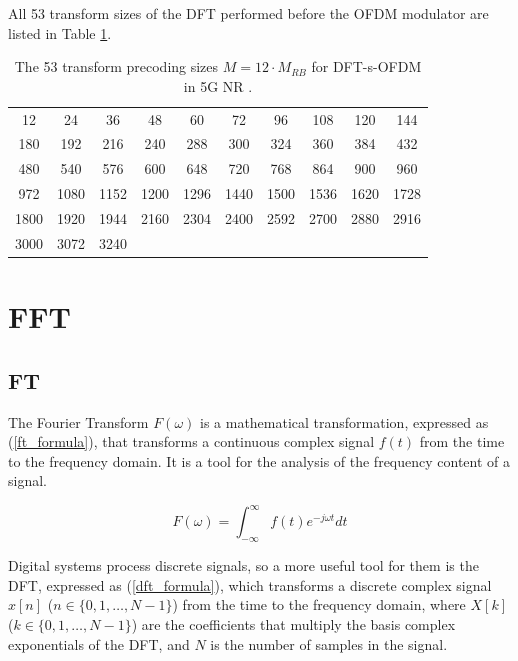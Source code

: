 \documentclass[a4paper,12pt, master]{etf}
\begin{document}
All 53 transform sizes of the DFT performed before the OFDM modulator are listed in Table \ref{tab:nr_precoding_sizes}.

\begin{table}[htb]
\centering
\caption{The 53 transform precoding sizes $M = 12 \cdot M_{RB}$ for DFT-s-OFDM in 5G NR \cite{17}.}
\medskip
\label{tab:nr_precoding_sizes}
\begin{tabular}{c c c c c c c c c c}
\hline
12 & 24 & 36 & 48 & 60 & 72 & 96 & 108 & 120 & 144\\
180 & 192 & 216 & 240 & 288 & 300 & 324 & 360 & 384 & 432\\
480 & 540 & 576 & 600 & 648 & 720 & 768 & 864 & 900 & 960\\
972 & 1080 & 1152 & 1200 & 1296 & 1440 & 1500 & 1536 & 1620 & 1728\\
1800 & 1920 & 1944 & 2160 & 2304 & 2400 & 2592 & 2700 & 2880 & 2916\\
3000 & 3072 & 3240 & & & & & & & \\
\hline
\end{tabular}
\end{table}

\section{FFT}

\subsection{FT}

The Fourier Transform $F(\omega)$ is a mathematical transformation, expressed as (\ref{ft_formula}), that transforms a continuous complex signal $f(t)$ from the time to the frequency domain. It is a tool for the analysis of the frequency content of a signal.

\begin{equation}
    F(\omega) = \int_{-\infty}^{\infty} f(t) e^{-j \omega t} dt
\label{ft_formula}
\end{equation}

Digital systems process discrete signals, so a more useful tool for them is the DFT, expressed as (\ref{dft_formula}), which transforms a discrete complex signal $x[n]$ ($n \in \{0, 1, \ldots, N-1\}$) from the time to the frequency domain, where $X[k]$ ($k \in \{0, 1, \ldots, N-1\}$) are the coefficients that multiply the basis complex exponentials of the DFT, and $N$ is the number of samples in the signal.
\end{document}
